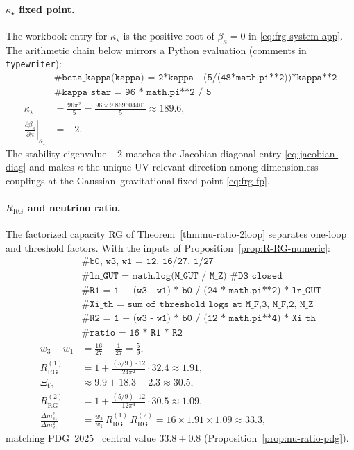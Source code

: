 \documentclass[aps,prd,onecolumn,amsmath,amssymb,nofootinbib,11pt]{revtex4-2}
\numberwithin{equation}{section}
\theoremstyle{plain}
\theoremstyle{definition}
\theoremstyle{remark}
\begin{document}
\paragraph{$\kappa_\star$ fixed point.}
The workbook entry for $\kappa_\star$ is the positive root of
$\beta_\kappa=0$ in \eqref{eq:frg-system-app}. The arithmetic chain below
mirrors a Python evaluation (comments in \texttt{typewriter}):
\begin{equation}\label{eq:workbook-kappa}
\begin{aligned}
  &\texttt{\# beta\_kappa(kappa) = 2*kappa - (5/(48*math.pi**2))*kappa**2}\\
  &\texttt{\# kappa\_star = 96 * math.pi**2 / 5}\\
  \kappa_\star
  &= \frac{96\pi^2}{5}
  = \frac{96\times 9.869604401}{5}
  \approx 189.6,\\
  \left.\frac{\partial\beta_\kappa}{\partial\kappa}\right|_{\kappa_\star}
  &= -2.
\end{aligned}
\end{equation}
The stability eigenvalue $-2$ matches the Jacobian diagonal entry
\eqref{eq:jacobian-diag} and makes $\kappa$ the unique UV-relevant direction
among dimensionless couplings at the Gaussian--gravitational fixed point
\eqref{eq:frg-fp}.

\paragraph{$R_{\mathrm{RG}}$ and neutrino ratio.}
The factorized capacity RG of Theorem~\ref{thm:nu-ratio-2loop} separates
one-loop and threshold factors. With the inputs of
Proposition~\ref{prop:R-RG-numeric}:
\begin{equation}\label{eq:workbook-R-RG}
\begin{aligned}
  &\texttt{\# b0, w3, w1 = 12, 16/27, 1/27}\\
  &\texttt{\# ln\_GUT = math.log(M\_GUT / M\_Z)  \# D3 closed}\\
  &\texttt{\# R1 = 1 + (w3 - w1) * b0 / (24 * math.pi**2) * ln\_GUT}\\
  &\texttt{\# Xi\_th = sum of threshold logs at M\_F,3, M\_F,2, M\_Z}\\
  &\texttt{\# R2 = 1 + (w3 - w1) * b0 / (12 * math.pi**4) * Xi\_th}\\
  &\texttt{\# ratio = 16 * R1 * R2}\\
  w_3-w_1 &= \frac{16}{27}-\frac{1}{27}=\frac{5}{9},\\
  R_{\mathrm{RG}}^{(1)}
  &= 1+\frac{(5/9)\cdot 12}{24\pi^2}\cdot 32.4
  \approx 1.91,\\
  \Xi_{\mathrm{th}} &\approx 9.9+18.3+2.3 \approx 30.5,\\
  R_{\mathrm{RG}}^{(2)}
  &= 1+\frac{(5/9)\cdot 12}{12\pi^4}\cdot 30.5
  \approx 1.09,\\
  \frac{\Delta m^2_{31}}{\Delta m^2_{21}}
  &= \frac{w_3}{w_1}\,R_{\mathrm{RG}}^{(1)}\,R_{\mathrm{RG}}^{(2)}
  = 16\times 1.91\times 1.09
  \approx 33.3,
\end{aligned}
\end{equation}
matching PDG~2025~\cite{PDG2025} central value $33.8\pm 0.8$
(Proposition~\ref{prop:nu-ratio-pdg}).
\end{document}
